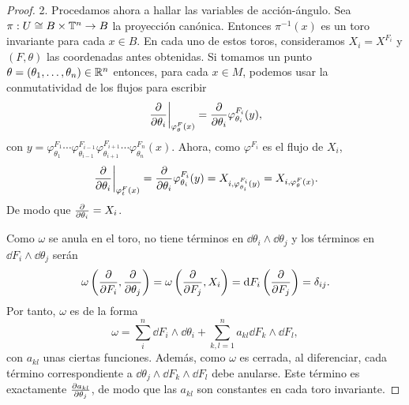 \begin{proof}
 2. Procedamos ahora a hallar las variables de acción-ángulo. Sea $\pi:U\cong B\times \mathbb{T}^n\rightarrow B$ la proyección canónica. Entonces $\pi^{-1}(x)$ es un toro invariante para cada $x \in B$. En cada uno de estos toros, consideramos $X_i=X^{F_i}$ y $(F,\theta)$ las coordenadas antes obtenidas. Si tomamos un punto $\theta=(\theta_1,\dots,\theta_n)\in \mathbb{R}^n$ entonces, para cada $x\in M$, podemos usar la conmutatividad de los flujos para escribir
\[
  \left. \frac{\partial}{\partial \theta_i}\right|_{\varphi^F_{\theta}(x)} = \frac{\partial}{\partial \theta_i} \varphi^{F_i}_{\theta_i}(y),
\]
con $y=\varphi^{F_1}_{\theta_1}\cdots\varphi^{F_{i-1}}_{\theta_{i-1}}\varphi^{F_{i+1}}_{\theta_{i+1}}\cdots\varphi^{F_{n}}_{\theta_{n}}(x)$. Ahora, como $\varphi^{F_i}$ es el flujo de $X_i$,
\begin{equation*}
  \left. \frac{\partial}{\partial \theta_i}\right|_{\varphi^F_t(x)} = \frac{\partial}{\partial \theta_i} \varphi^{F_i}_{\theta_i}(y)=X_{i, \varphi^{F_i}_{\theta_i}(y)}=X_{i,\varphi^F_{\theta}(x)}.
\end{equation*}
De modo que $\frac{\partial}{\partial \theta_i}=X_i$.

Como $\omega$ se anula en el toro, no tiene términos en $\dd \theta_i \wedge \dd \theta_j$ y los términos en $\dd F_i \wedge \dd \theta_j$ serán
\[
  \omega\left(\frac{\partial}{\partial F_i},\frac{\partial}{\partial \theta_j}\right)=\omega\left(\frac{\partial}{\partial F_j},X_i\right)=\mathrm{d} F_i\left(\frac{\partial}{\partial F_j}\right)=\delta_{ij}.
\]
Por tanto, $\omega$ es de la forma
\[
  \omega = \sum_{i}^n  \dd F_i \wedge \dd \theta_i + \sum_{k,l=1}^n a_{kl} \dd F_k \wedge \dd F_l,
\]
con $a_{kl}$ unas ciertas funciones. Además, como $\omega$ es cerrada, al diferenciar, cada término correspondiente a $\dd \theta_j \wedge \dd F_k \wedge \dd F_l$ debe anularse. Este término es exactamente
  $\frac{\partial a_{kl}}{\partial \theta_j}$,
de modo que las $a_{kl}$ son constantes en cada toro invariante.


\end{proof}
